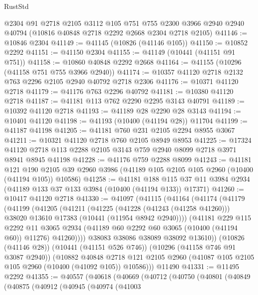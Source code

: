 \begin{lexlean}{RustStd}
\begin{coremodule}
    @2304
    @91
    @2718
    @2105
    @3112
    @105
    @751
    @755
    @2300
    @3966
    @2940
    @2940
    @40794
    (@10816 @40848 @2718 @2292 @2668 @2304 @2718 @2105)
@41146 := @10846 @2304
@41149 := @41145 (@10826 (@41146 @105))
@41150 := @10852 @2292
@41151 := @41150 @2304
@41155 := @41149 (@10441 (@41151 @91 @751))
@41158 := @10860 @40848 @2292 @2668
@41164 := @41155 (@10296 (@41158 @751 @755 @3966 @2940))
@41174 := @10357 @41120 @2718 @2132 @763 @2296 @2105 @2940 @40792 @2718 @2306
@41176 := @10371 @41120 @2718
@41179 := @41176 @763 @2296 @40792
@41181 := @10380 @41120 @2718
@41187 := @41181 @113 @762 @2290 @2295 @3143 @40791
@41189 := @10392 @41120 @2718
@41193 := @41189 @28 @2290 @28 @3143
@41194 := @10401 @41120
@41198 := @41193 (@10400 (@41194 @28)) @11704
@41199 := @41187 @41198
@41205 := @41181 @760 @231 @2105 @2294 @8955 @3067
@41211 := @10321 @41120 @2718 @760 @2105 @8949 @8953
@41225 := @17324 @41120 @2718 @113 @2288 @2105 @3143 @759 @2940 @8099 @2718 @3971 @8941 @8945 @41198
@41228 := @41176 @759 @2288 @8099
@41243 := @41181
    @121
    @190
    @2105
    @39
    @2960
    @3986
    (@41189 @105 @2105 @105 @2960 (@10400 (@41194 @105)) @10586)
@41258 := @41181
    @188
    @115
    @37
    @11
    @3984
    @2934
    (@41189 @133 @37 @133 @3984 (@10400 (@41194 @133)) @17371)
@41260 := @10417 @41120 @2718
@41330 := @41097
    (@41115
      (@41164
        (@41174
          (@41179
            (@41199
              (@41205
                (@41211
                  (@41225
                    (@41228 (@41243 (@41258 @41260)))
                    @38020
                    @13610
                    @17383
                    (@10441 (@11954 @8942 @2940))))
                (@41181
                  @229
                  @115
                  @2292
                  @11
                  @3065
                  @2934
                  (@41189 @60 @2292 @60 @3065 (@10400 (@41194 @60)) @11276)
                  @41260))))
          @38083
          @38086
          @38089
          @38092
          @13610))
      (@10826 (@41146 @28))
      (@10441 (@41151 @526 @746))
      (@10296 (@41158 @746 @91 @3087 @2940))
      (@10882
        @40848
        @2718
        @121
        @2105
        @2960
        (@41087 @105 @2105 @105 @2960 (@10400 (@41092 @105)) @10586)))
    @11490
@41331 := @11495 @2292
@41355 := @40557
    (@40618
      (@40669
        (@40712
          (@40750
            (@40801
              (@40849
                (@40875
                  (@40912
                    (@40945
                      (@40974
                        (@41003

\end{coremodule}
\end{lexlean}
